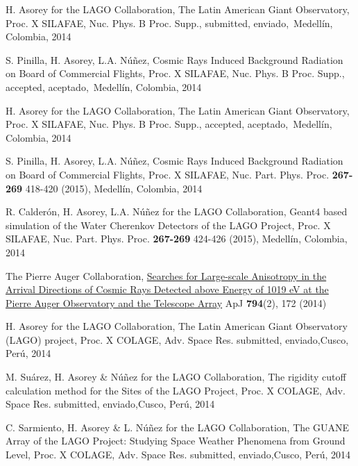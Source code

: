 \begin{etaremune}
\item {}H. Asorey for the LAGO Collaboration, {{The Latin American Giant Observatory}}, \en Proc. X SILAFAE, Nuc. Phys. B Proc. Supp., \ifeng submitted, \else enviado,\fi\ Medellín, Colombia, 2014

\item {}S. Pinilla, H. Asorey, L.A. Núñez, {{Cosmic Rays Induced Background Radiation on Board of Commercial Flights}}, \en Proc. X SILAFAE, Nuc. Phys. B Proc. Supp., \ifeng accepted, \else aceptado,\fi\ Medellín, Colombia, 2014

\item {}H. Asorey for the LAGO Collaboration, {{The Latin American Giant Observatory}}, \en Proc. X SILAFAE, Nuc. Phys. B Proc. Supp., \ifeng accepted, \else aceptado,\fi\ Medellín, Colombia, 2014

\item {}S. Pinilla, H. Asorey, L.A. Núñez, {{Cosmic Rays Induced Background Radiation on Board of Commercial Flights}}, \en Proc. X SILAFAE,  Nuc. Part. Phys. Proc. {\bf{267-269}} 418-420 (2015), Medellín, Colombia, 2014

\item {}R. Calderón, H. Asorey, L.A. Núñez for the LAGO Collaboration, {{Geant4 based simulation of the Water Cherenkov Detectors of the LAGO Project}}, \en Proc. X SILAFAE, Nuc. Part. Phys. Proc. {\bf{267-269}} 424-426 (2015), Medellín, Colombia, 2014

\item {}The Pierre Auger Collaboration, \href{http://dx.doi.org/10.1088/0004-637X/794/2/172}{{Searches for Large-scale Anisotropy in the Arrival Directions of Cosmic Rays Detected above Energy of 1019 eV at the Pierre Auger Observatory and the Telescope Array}} ApJ {\bf{794}}(2), 172 (2014)

\item {}H. Asorey for the LAGO Collaboration, {{The Latin American Giant Observatory (LAGO) project}}, \en Proc. X COLAGE, Adv. Space Res. \ifeng submitted, \else enviado,\fi  Cusco, Perú, 2014

\item {}M. Suárez, H. Asorey \& Núñez for the LAGO Collaboration, {{The rigidity cutoff calculation method for the Sites of the LAGO Project}}, \en Proc. X COLAGE, Adv. Space Res. \ifeng submitted, \else enviado,\fi  Cusco, Perú, 2014

\item {}C. Sarmiento, H. Asorey \& L. Núñez for the LAGO Collaboration, {{The GUANE Array of the LAGO Project: Studying Space Weather Phenomena from Ground Level}}, \en Proc. X COLAGE, Adv. Space Res. \ifeng submitted, \else enviado,\fi  Cusco, Perú, 2014


\end{etaremune}

